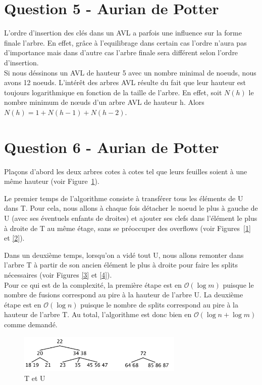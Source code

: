 \documentclass[10pt,a4paper]{article}
\begin{document}
\section*{Question 5 - Aurian de Potter}
L'ordre d'insertion des clés dans un AVL a parfois une influence sur la forme finale l'arbre. En effet, grâce à l'equilibrage dans certain cas l'ordre n'aura pas d'importance mais dans d'autre cas l'arbre finale sera différent selon l'ordre d'insertion.\\

Si nous déssinons un AVL de hauteur 5 avec un nombre minimal de noeuds, nous avons 12 noeuds. L’intérêt des arbres AVL résulte du fait que leur hauteur est toujours logarithmique en fonction de la taille de l’arbre. En effet, soit $\mathcal{} N(h)$ le nombre minimum de nœuds d’un arbre AVL de hauteur h. Alors $\mathcal{} N(h) = 1 + N(h-1) + N(h-2)$.
\section*{Question 6 - Aurian de Potter}
Plaçons d'abord les deux arbres cotes à cotes tel que leurs feuilles soient à une même hauteur (voir Figure~\ref{TU}).

Le premier temps de l'algorithme consiste à transférer tous les éléments de U dans T. Pour cela, nous allons à chaque fois détacher le noeud le plus à gauche de U (avec ses éventuels enfants de droites) et ajouter ses clefs dans l'élément le plus à droite de T au même étage, sans se préoccuper des overflows (voir Figures~\ref{1} et \ref{2}).

Dans un deuxième temps, lorsqu'on a vidé tout U, nous allons remonter dans l'arbre T à partir de son ancien élément le plus à droite pour faire les splits nécessaires (voir Figures \ref{3} et \ref{4}).\\

Pour ce qui est de la complexité, la première étape est en $\mathcal{O}(\log m)$ puisque le nombre de fusions correspond au pire à la hauteur de l'arbre U. La deuxième étape est en $\mathcal{O}(\log n)$ puisque le nombre de splits correspond au pire à la hauteur de l'arbre T. Au total, l'algorithme est donc bien en $\mathcal{O}(\log n + \log m)$ comme demandé.

\begin{figure}[!h]
	\begin{center}
		\includegraphics[width=0.7\textwidth]{TU.png}
		\caption{T et U}
		\label{TU}
	\end{center}
\end{figure}
\end{document}
